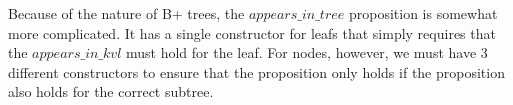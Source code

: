 Because of the nature of B+ trees, the $appears\_in\_tree$ proposition is somewhat more complicated. It has a single constructor for leafs that simply requires that the $appears\_in\_kvl$ must hold for the leaf. For nodes, however, we must have 3 different constructors to ensure that the proposition only holds if the proposition also holds for the correct subtree.
% 
% 
% 
% 
% 
% 
% 

